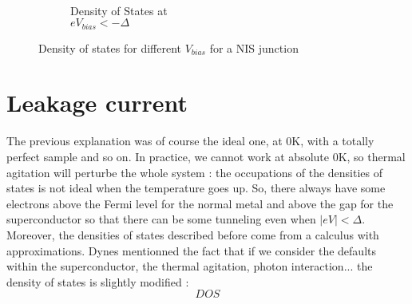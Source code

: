 \begin{figure}
\begin{subfigure}[t]{0.30\textwidth}
                \label{DOSNIS+}
                \end{subfigure}
                ~
                \begin{subfigure}[t]{0.30\textwidth}
                \centering
                \caption{Density of States at\\$eV_{bias}<-\Delta$}
                \label{DOSNIS-}
                \end{subfigure}
                \caption{Density of states for different $V_{bias}$ for a NIS junction}
                \label{DOSNIS}
        \end{figure}
        
        
        
        \section{Leakage current}
        
        The previous explanation was of course the ideal one, at 0K, with a totally perfect sample and so on. In practice, we cannot work at absolute 0K, so thermal agitation will perturbe the whole system : the occupations of the densities of states is not ideal when the temperature goes up. So, there always have some electrons above the Fermi level for the normal metal and above the gap for the superconductor so that there can be some tunneling even when $|eV|<\Delta$.
        Moreover, the densities of states described before come from a calculus with approximations. Dynes\cite{} mentionned the fact that if we consider the defaults within the superconductor, the thermal agitation, photon interaction... the density of states is slightly modified :
        \[DOS\]
        
